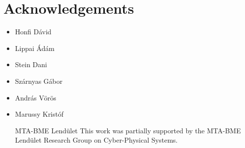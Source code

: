 \chapter*{Acknowledgements}
{}
\thispagestyle{plain}

\begin{itemize}

\item
Honfi Dávid
\item
Lippai Ádám
\item
Stein Dani
\item
Szárnyas Gábor
\item
András Vörös
\item
Marussy Kristóf


MTA-BME Lendület This work was partially supported by the MTA-BME Lendület Research Group on Cyber-Physical Systems.



\end{itemize}

